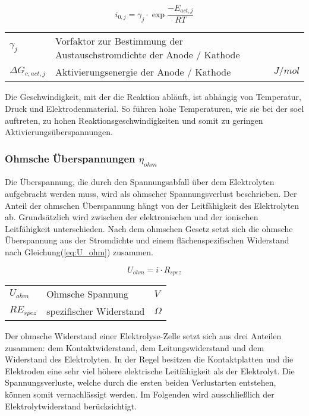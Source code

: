 \documentclass[onecolumn,10pt,titlepage]{article}
\begin{document}
			\begin{equation}
				i_{0,j}= \gamma_j\cdot \exp{\frac{-E_{act,j}}{RT}}
				\label{eq_i0}
			\end{equation}
			
			\begin{table}[H]
				\begin{tabular*}{\textwidth}{lll}
					$\gamma_j$&Vorfaktor zur Bestimmung der Austauschstromdichte der Anode / Kathode&\\
					$\Delta G_{c,act,j}$&Aktivierungsenergie der Anode / Kathode&$J/mol$\\
				\end{tabular*}
			\end{table}
			
			Die Geschwindigkeit, mit der die Reaktion abläuft, ist abhängig von Temperatur, Druck und Elektrodenmaterial. So führen hohe Temperaturen, wie sie bei der \gls{soel} auftreten, zu hohen Reaktionsgeschwindigkeiten und somit zu geringen Aktivierungsüberspannungen.
			
			\subsubsection*{Ohmsche Überspannungen $\eta_{ohm}$}
			Die Überspannung, die durch den Spannungsabfall über dem Elektrolyten aufgebracht werden muss, wird als ohmscher Spannungsverlust beschrieben.\cite{Klein.2013} Der Anteil der ohmschen Überspannung hängt von der Leitfähigkeit des Elektrolyten ab. Grundsätzlich wird zwischen der elektronischen und der ionischen Leitfähigkeit unterschieden. Nach dem ohmschen Gesetz setzt sich die ohmsche Überspannung aus der Stromdichte und einem flächenspezifischen Widerstand nach Gleichung(\ref{eq:U_ohm}) zusammen.\cite{Goetz.2000}
			
			\begin{equation}
			U_{ohm}=i\cdot R_{spez}
			\label{eq:U_ohm}
			\end{equation}
			
			\begin{table}[H]
				\begin{tabular*}{\textwidth}{lll}
					$U_{ohm}$&Ohmsche Spannung&$V$\\
					$RE_{spez}$&spezifischer Widerstand&$\Omega$\\
				\end{tabular*}
			\end{table}

			Der ohmsche Widerstand einer Elektrolyse-Zelle setzt sich aus drei Anteilen zusammen: dem Kontaktwiderstand, dem Leitungswiderstand und dem Widerstand des Elektrolyten. In der Regel besitzen die Kontaktplatten und die Elektroden eine sehr viel höhere elektrische Leitfähigkeit als der Elektrolyt. Die Spannungsverluste, welche durch die ersten beiden Verlustarten entstehen, können somit vernachlässigt werden. Im Folgenden wird ausschließlich der Elektrolytwiderstand berücksichtigt.\cite{NI.2007}
			
\end{document}

